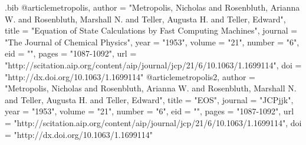 \begin{filecontents}{\jobname.bib}
  @article{metropolis,
    author = "Metropolis, Nicholas and Rosenbluth, Arianna W. and Rosenbluth, Marshall N. and Teller, Augusta H. and Teller, Edward",
    title = "Equation of State Calculations by Fast Computing Machines",
    journal = "The Journal of Chemical Physics",
    year = "1953",
    volume = "21",
    number = "6", 
    eid = "",
    pages = "1087-1092",
    url = "http://scitation.aip.org/content/aip/journal/jcp/21/6/10.1063/1.1699114",
    doi = "http://dx.doi.org/10.1063/1.1699114" 
  }
  @article{metropolis2,
    author = "Metropolis, Nicholas and Rosenbluth, Arianna W. and Rosenbluth, Marshall N. and Teller, Augusta H. and Teller, Edward",
    title = "EOS",
    journal = "JCPjjk",
    year = "1953",
    volume = "21",
    number = "6",
    eid = "",
    pages = "1087-1092",
    url = "http://scitation.aip.org/content/aip/journal/jcp/21/6/10.1063/1.1699114",
    doi = "http://dx.doi.org/10.1063/1.1699114"
  }
\end{filecontents}